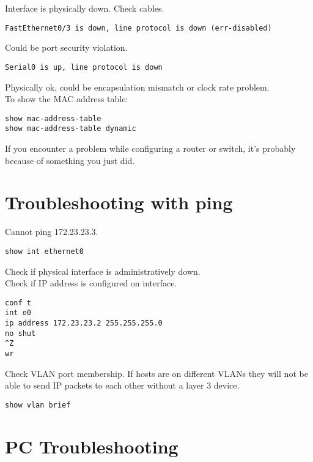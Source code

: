 \documentclass{article}
\begin{document}
Interface is physically down. Check cables.

\begin{verbatim}
FastEthernet0/3 is down, line protocol is down (err-disabled)
\end{verbatim}

Could be port security violation.

\begin{verbatim}
Serial0 is up, line protocol is down
\end{verbatim}

Physically ok, could be encapsulation mismatch or clock rate problem.\\

To show the MAC address table:

\begin{verbatim}
show mac-address-table
show mac-address-table dynamic
\end{verbatim}

If you encounter a problem while configuring a router or switch, it's probably
because of something you just did.

\section{Troubleshooting with ping}

Cannot ping 172.23.23.3.

\begin{verbatim}
show int ethernet0  
\end{verbatim}

Check if physical interface is administratively down.\\

Check if IP address is configured on interface.

\begin{verbatim}
conf t
int e0
ip address 172.23.23.2 255.255.255.0
no shut
^Z
wr
\end{verbatim}

Check VLAN port membership. If hosts are on different VLANs they will not be
able to send IP packets to each other without a layer 3 device.

\begin{verbatim}
show vlan brief
\end{verbatim}

\section{PC Troubleshooting}
\end{document}
